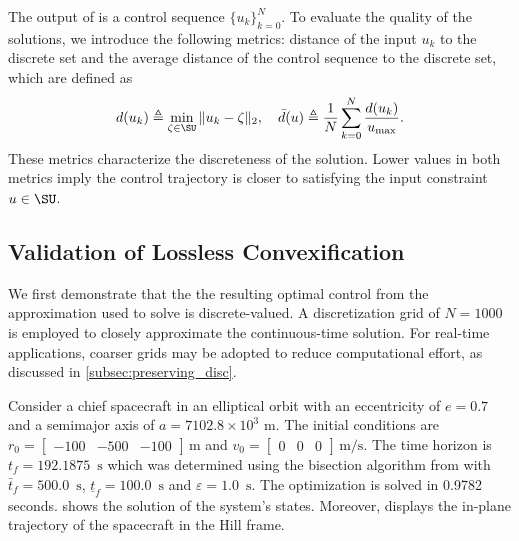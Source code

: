 \documentclass[conf]{new-aiaa}
\begin{document}
The output of  is a control sequence $\{u_k\}_{k=0}^N$. To evaluate the quality of the solutions, we introduce the following metrics: distance of the input $u_k$ to the discrete set and the average distance of the control sequence to the discrete set, which are defined as
%
\begin{equation*}
    d(u_k) \triangleq \min_{\zeta \in \SU} \| u_k - \zeta \|_2, \quad 
    \bar{d}(u) \triangleq \frac{1}{N} \sum_{k=0}^N \frac{d(u_k)}{u_{\max}}.
\end{equation*}
%
These metrics characterize the discreteness of the solution. Lower values in both metrics imply the control trajectory is closer to satisfying the input constraint $u \in \SU$.

\subsection{Validation of Lossless Convexification}\label{subsec:validation}

We first demonstrate that the the resulting optimal control from the approximation used to solve  is discrete-valued. A discretization grid of $N=1000$ is employed to closely approximate the continuous-time solution. For real-time applications, coarser grids may be adopted to reduce computational effort, as discussed in \cref{subsec:preserving_disc}. 

Consider a chief spacecraft in an elliptical orbit with an eccentricity of $e=0.7$ and a semimajor axis of $a=7102.8 \times 10^3 \text{ m}$. The initial conditions are $r_0 = \begin{bmatrix} -100 & -500 & -100\end{bmatrix}\,\text{m}$ and $v_0 = \begin{bmatrix} 0 & 0 & 0 \end{bmatrix}\,\text{m/s}$. The time horizon is $t_f = 192.1875\,\text{ s}$ which was determined using the bisection algorithm from  with $\bar{t}_f = 500.0\,\text{ s}$, $\underline{t}_f=100.0\,\text{ s}$ and $\varepsilon=1.0\,\text{ s}$. The optimization is solved in 0.9782 seconds.  shows the solution of the system's states. Moreover,  displays the in-plane trajectory of the spacecraft in the Hill frame.
\end{document}
